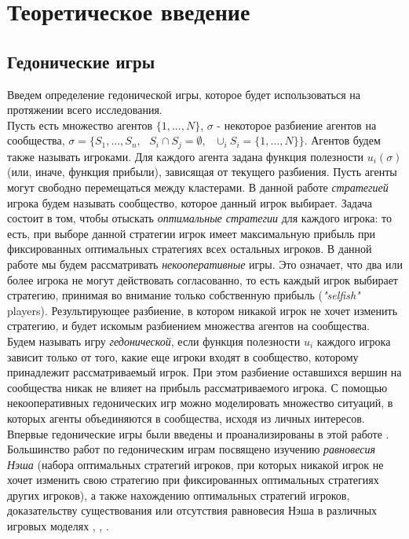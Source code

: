 \chapter{Теоретическое введение}

\section{Гедонические игры}
Введем определение гедонической игры, которое будет использоваться на протяжении всего исследования.\\

Пусть есть множество агентов $\{1,...,N\}$, $\sigma$ - некоторое разбиение агентов на сообщества, $\sigma=\{S_1,...,S_n,\textbf{ }S_i\cap S_j=\emptyset,\textbf{ }\cup_i S_i=\{1,...,N\}\}$. Агентов будем также называть игроками. Для каждого агента задана функция полезности $u_i(\sigma)$ (или, иначе, функция прибыли), зависящая от текущего разбиения. Пусть агенты могут свободно перемещаться между кластерами. В данной работе \textit{стратегией} игрока будем называть сообщество, которое данный игрок выбирает. Задача состоит в том, чтобы отыскать \textit{оптимальные стратегии} для каждого игрока: то есть, при выборе данной стратегии игрок имеет максимальную прибыль при фиксированных оптимальных стратегиях всех остальных игроков. В данной работе мы будем рассматривать \textit{некооперативные} игры. Это означает, что два или более игрока не могут действовать согласованно, то есть каждый игрок выбирает стратегию, принимая во внимание только собственную прибыль (\textit{"selfish"} players). Результирующее разбиение, в котором никакой игрок не хочет изменить стратегию, и будет искомым разбиением множества агентов на сообщества.\\

Будем называть игру \textit{гедонической}, если функция полезности $u_i$ каждого игрока зависит только от того, какие еще игроки входят в сообщество, которому принадлежит рассматриваемый игрок. При этом разбиение оставшихся вершин на сообщества никак не влияет на прибыль рассматриваемого игрока. С помощью некооперативных гедонических игр можно моделировать множество ситуаций, в которых агенты объединяются в сообщества, исходя из личных интересов. Впервые гедонические игры были введены и проанализированы в этой работе \cite{firsthg}. Большинство работ по гедоническим играм посвящено изучению \textit{равновесия Нэша} (набора оптимальных стратегий игроков, при которых никакой игрок не хочет изменить свою стратегию при фиксированных оптимальных стратегиях других игроков), а также нахождению оптимальных стратегий игроков, доказательству существования или отсутствия равновесия Нэша в различных игровых моделях \cite{core1}, \cite{core2}, \cite{core3}.\\

